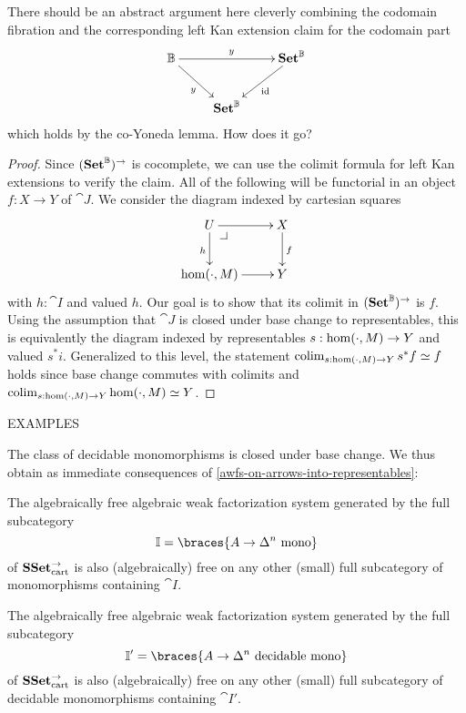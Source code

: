 \documentclass[reqno,10pt,a4paper,oneside]{amsart}
\begin{document}
\begin{question}
There should be an abstract argument here cleverly combining the codomain fibration and the corresponding left Kan extension claim for the codomain part
\[
\xymatrix{
  \cat{B}
  \ar[rr]^{y}
  \ar[dr]_{y}
&&
  \Set^{\cat{B}}
  \ar[dl]^{\id}
\\&
  \Set^{\cat{B}}
}
\]
which holds by the co-Yoneda lemma.
How does it go?
\end{question}

\begin{proof}
Since $(\mathbf{Set}^{\mathbb{B}})^{\to}$ is cocomplete, we can use the colimit formula for left Kan extensions to verify the claim.
All of the following will be functorial in an object $f : X \to Y$ of $\cat{J}$.
We consider the diagram indexed by cartesian squares
\[
\xymatrix{
  U
  \ar[r]
  \ar[d]_{h}
  \pullback{dr}
&
  X
  \ar[d]^{f}
\\
  \hom(\arghole, M)
  \ar[r]
&
  Y
}
\]
with $h : \cat{I}$ and valued $h$.
Our goal is to show that its colimit in $(\mathbf{Set}^{\mathbb{B}})^{\to}$ is $f$.
Using the assumption that $\cat{J}$ is closed under base change to representables, this is equivalently the diagram indexed by representables $s : \hom(\mathop{\cdot}, M) \to Y$ and valued $s^* i$.
Generalized to this level, the statement $\operatorname{colim}_{s : \hom(\mathop{\cdot}, M) \to Y} s^* f \simeq f$ holds since base change commutes with colimits and $\operatorname{colim}_{s : \hom(\mathop{\cdot}, M) \to Y} \hom(\mathop{\cdot}, M) \simeq Y$.
\end{proof}


EXAMPLES







The class of decidable monomorphisms is closed under base change.
We thus obtain as immediate consequences of \cref{awfs-on-arrows-into-representables}:

\begin{corollary}
\label{monos-into-representables}
The algebraically free algebraic weak factorization system generated by the full subcategory
\[\cat{I} = \braces{A \to \Delta^n\ \text{\normalfont{mono}}}\]
of $\mathbf{SSet}_{\text{\normalfont{cart}}}^{\to}$ is also (algebraically) free on any other (small) full subcategory of monomorphisms containing $\cat{I}$.
\end{corollary}

\begin{corollary}
\label{decidable-monos-into-representables}
The algebraically free algebraic weak factorization system generated by the full subcategory
\[\cat{I}' = \braces{A \to \Delta^n\ \text{\normalfont{decidable mono}}}\]
of $\mathbf{SSet}_{\text{\normalfont{cart}}}^{\to}$ is also (algebraically) free on any other (small) full subcategory of decidable monomorphisms containing $\cat{I}'$.
\end{corollary}
\end{document}
